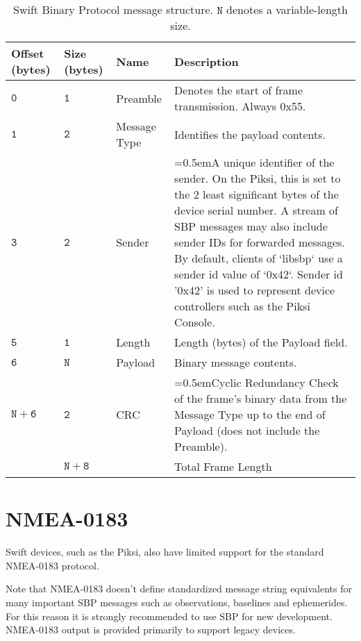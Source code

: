 \documentclass[9pt]{extarticle}
\numberwithin{table}{subsection}
\numberwithin{field}{subsection}
\begin{document}
\begin{table}[h]
  \centering
  \begin{tabularx}{\textwidth}{aaaX}
    \toprule
    Offset (bytes) & Size (bytes) & Name & Description \\
    \midrule
    $\mathtt{0}$ & $\mathtt{1}$ & {Preamble} & Denotes the start of frame transmission. Always 0x55. \\
    $\mathtt{1}$ & $\mathtt{2}$ & {Message Type} & Identifies the payload contents. \\
    $\mathtt{3}$ & $\mathtt{2}$ & {Sender} & \hangindent=0.5em{A unique identifier of the sender. On the Piksi, this is set to the 2 least significant bytes of the device serial number. A stream of SBP messages may also include sender IDs for forwarded messages. By default, clients of `libsbp` use a sender id value of `0x42`.  Sender id '0x42' is used to represent device controllers such as the Piksi Console.} \\
    $\mathtt{5}$ & $\mathtt{1}$ & {Length} & Length (bytes) of the {Payload} field. \\
    $\mathtt{6}$ & $\mathtt{N}$ & {Payload} & Binary message contents. \\
    $\mathtt{N+6}$ & $\mathtt{2}$ & {CRC} & \hangindent=0.5em{Cyclic Redundancy Check of the frame's binary data from the Message Type up to the end of Payload (does not include the Preamble).} \\
    \midrule
    & $\mathtt{N+8}$ & &Total Frame Length \\
    \bottomrule
  \end{tabularx}
  \caption{Swift Binary Protocol message structure. $\mathtt{N}$ denotes a variable-length size.}
  \label{tab:message}
\end{table}

\section{NMEA-0183}
\label{sec:NMEA}

\begin{large}

Swift devices, such as the Piksi, also have limited support for the standard
NMEA-0183 protocol.

Note that NMEA-0183 doesn't define standardized message
string equivalents for many important SBP messages such as observations,
baselines and ephemerides. For this reason it is strongly recommended to use
SBP for new development. NMEA-0183 output is provided primarily to support
legacy devices.

\end{large}
\end{document}
